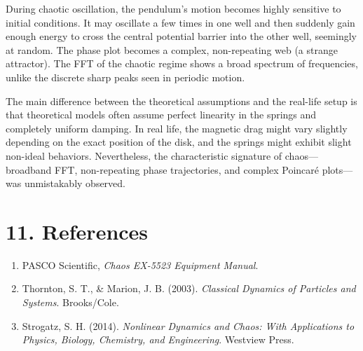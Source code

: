 \documentclass[12pt, a4paper]{article}
\begin{document}
During chaotic oscillation, the pendulum's motion becomes highly sensitive to initial conditions. It may oscillate a few times in one well and then suddenly gain enough energy to cross the central potential barrier into the other well, seemingly at random. The phase plot becomes a complex, non-repeating web (a strange attractor). The FFT of the chaotic regime shows a broad spectrum of frequencies, unlike the discrete sharp peaks seen in periodic motion. 

The main difference between the theoretical assumptions and the real-life setup is that theoretical models often assume perfect linearity in the springs and completely uniform damping. In real life, the magnetic drag might vary slightly depending on the exact position of the disk, and the springs might exhibit slight non-ideal behaviors. Nevertheless, the characteristic signature of chaos—broadband FFT, non-repeating phase trajectories, and complex Poincar\'e plots—was unmistakably observed.

\section*{11. References}
\begin{enumerate}
    \item PASCO Scientific, \textit{Chaos EX-5523 Equipment Manual}.
    \item Thornton, S. T., \& Marion, J. B. (2003). \textit{Classical Dynamics of Particles and Systems}. Brooks/Cole.
    \item Strogatz, S. H. (2014). \textit{Nonlinear Dynamics and Chaos: With Applications to Physics, Biology, Chemistry, and Engineering}. Westview Press.
\end{enumerate}
\end{document}

